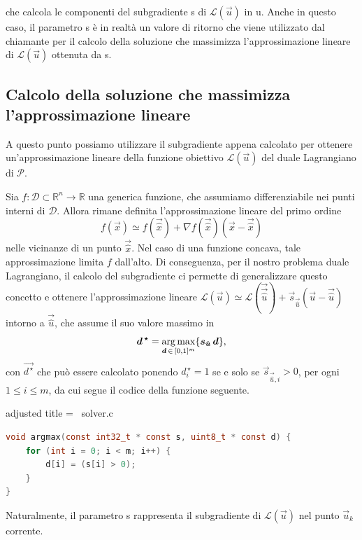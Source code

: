 \noindent
che calcola le componenti del subgradiente {\jbm s} di \( \mathcal{L}(\vec{u}) \) in {\jbm u}. Anche in questo caso, il
parametro {\jbm s} è in realtà un valore di ritorno che viene utilizzato dal chiamante per il calcolo
della soluzione che massimizza l'approssimazione lineare di \( \mathcal{L}(\vec{u}) \) ottenuta da {\jbm s}.

\subsection{Calcolo della soluzione che massimizza l'approssimazione lineare}

A questo punto possiamo utilizzare il subgradiente appena calcolato per ottenere un'approssimazione lineare della
funzione obiettivo \( \mathcal{L}(\vec{u}) \) del duale Lagrangiano di \( \mathcal{P} \).

Sia \( f\colon \mathcal{D}\subset\mathbb{R}^n \to \mathbb{R} \) una generica funzione, che assumiamo differenziabile nei
punti interni di \( \mathcal{D} \). Allora rimane definita l'approssimazione lineare del primo ordine
\begin{equation}
    f(\vec{x}) \simeq f(\vec{\hat{x}}) + \nabla f(\vec{\hat{x}})(\vec{x} - \vec{\hat{x}})
\end{equation}
nelle vicinanze di un punto \( \vec{\hat{x}} \). Nel caso di una funzione concava, tale approssimazione limita \( f \)
dall'alto. Di conseguenza, per il nostro problema duale Lagrangiano, il calcolo del subgradiente ci permette di
generalizzare questo concetto e ottenere l'approssimazione lineare \( \mathcal{L}(\vec{u}) \simeq \mathcal{L}(\vec{\vec{\hat{u}}}) +
\vec{s}_{\vec{\hat{u}}}(\vec{u} - \vec{\hat{u}})\) intorno a \( \vec{\hat{u}} \), che assume il suo valore massimo in
\begin{equation}
\bm{d^{\,\star}} = \operatorname*{arg\,max}_{\bm{d}
\,\in\, [0, 1]^m } \{\bm{s}_{\bm{\hat{u}}}\, \bm{d}\},
\end{equation}
con
\(
    \vec{d^{\,\star}}
\)
che può essere calcolato ponendo \( d^{\,\star}_i = 1 \) se e solo se \( \vec{s}_{\vec{\hat{u}},i} > 0 \), per ogni \( 1 \leq i
\leq m \), da cui segue il codice della funzione seguente.

\begin{code}{adjusted title = {\cicon\ solver.c}}
\begin{lstlisting}[language=c, style = style, caption={Calcolo di \( \vec{d}_k = \argmax_{\vec{d} \,\in\, [0, 1]^m}
\,\{\vec{s}_k\,\vec{d}\}\).}]
void argmax(const int32_t * const s, uint8_t * const d) {
    for (int i = 0; i < m; i++) {
        d[i] = (s[i] > 0);
    }
}\end{lstlisting}
\end{code}
\noindent
Naturalmente, il parametro {\jbm s} rappresenta il subgradiente di \( \mathcal{L}(\vec{u}) \) nel punto \( \vec{u}_k \)
corrente.

